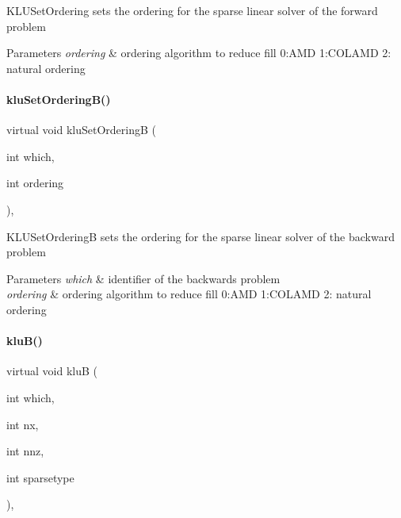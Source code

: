 K\+L\+U\+Set\+Ordering sets the ordering for the sparse linear solver of the forward problem


\begin{DoxyParams}{Parameters}
{\em ordering} & ordering algorithm to reduce fill 0\+:A\+MD 1\+:C\+O\+L\+A\+MD 2\+: natural ordering \\
\hline
\end{DoxyParams}
\mbox{\label{classamici_1_1_solver_aa24ecf586126da19bb338ec8d08fe323}} 
\paragraph{\texorpdfstring{klu\+Set\+Ordering\+B()}{kluSetOrderingB()}}
{\footnotesize\ttfamily virtual void klu\+Set\+OrderingB (\begin{DoxyParamCaption}\item[{int}]{which,  }\item[{int}]{ordering }\end{DoxyParamCaption})\hspace{0.3cm}{\ttfamily [protected]}, {}}

K\+L\+U\+Set\+OrderingB sets the ordering for the sparse linear solver of the backward problem


\begin{DoxyParams}{Parameters}
{\em which} & identifier of the backwards problem \\
\hline
{\em ordering} & ordering algorithm to reduce fill 0\+:A\+MD 1\+:C\+O\+L\+A\+MD 2\+: natural ordering \\
\hline
\end{DoxyParams}
\mbox{\label{classamici_1_1_solver_a5f9c6152e6e01f631cd5b68fd638281c}} 
\paragraph{\texorpdfstring{klu\+B()}{kluB()}}
{\footnotesize\ttfamily virtual void kluB (\begin{DoxyParamCaption}\item[{int}]{which,  }\item[{int}]{nx,  }\item[{int}]{nnz,  }\item[{int}]{sparsetype }\end{DoxyParamCaption})\hspace{0.3cm}{\ttfamily [protected]}, {}}

